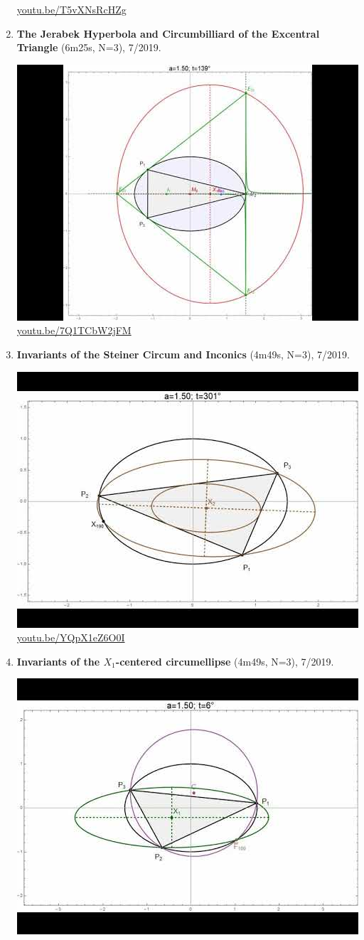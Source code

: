 \documentclass[12pt]{amsart}
\begin{document}
\begin{enumerate}[resume]
\begin{center}
\href{https://youtu.be/T5vXNsRcHZg}{\url{youtu.be/T5vXNsRcHZg}}\end{center}
% 
\item \textbf{The Jerabek Hyperbola and Circumbilliard of the Excentral Triangle} (6m25s, N=3), 7/2019. 
\begin{center}\includegraphics[width=.5\textwidth]{pics/7Q1TCbW2jFM.jpg} \\ 
\href{https://youtu.be/7Q1TCbW2jFM}{\url{youtu.be/7Q1TCbW2jFM}}\end{center}
% 
\item \textbf{Invariants of the Steiner Circum and Inconics} (4m49s, N=3), 7/2019. 
\begin{center}\includegraphics[width=.5\textwidth]{pics/YQpX1eZ6O0I.jpg} \\ 
\href{https://youtu.be/YQpX1eZ6O0I}{\url{youtu.be/YQpX1eZ6O0I}}\end{center}
% 
\item \textbf{Invariants of the $X_{1}$-centered circumellipse} (4m49s, N=3), 7/2019. 
\begin{center}\includegraphics[width=.5\textwidth]{pics/82gYh_3hIe4.jpg} \\ 

\end{center}
\end{enumerate}
\end{document}
